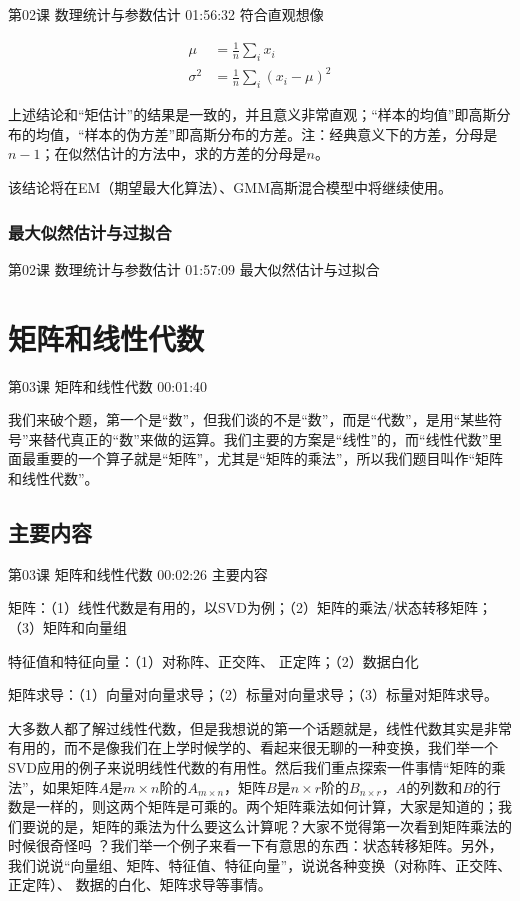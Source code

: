 \documentclass[UTF8]{ctexart}
\begin{document}
第02课 数理统计与参数估计 01:56:32 符合直观想像

\begin{equation}
\begin{aligned}
\mu &= \frac{1}{n} \sum_{i} x_{i} \\
\sigma^{2} &=\frac{1}{n}\sum_{i} (x_{i}-\mu)^{2}
\end{aligned}
\end{equation}

上述结论和“矩估计”的结果是一致的，并且意义非常直观；“样本的均值”即高斯分布的均值，“样本的伪方差”即高斯分布的方差。注：经典意义下的方差，分母是$n-1$；在似然估计的方法中，求的方差的分母是$n$。

该结论将在EM（期望最大化算法）、GMM高斯混合模型中将继续使用。

\subsubsection{最大似然估计与过拟合}

第02课 数理统计与参数估计 01:57:09 最大似然估计与过拟合

\newpage

\section{矩阵和线性代数}

第03课 矩阵和线性代数 00:01:40

我们来破个题，第一个是“数”，但我们谈的不是“数”，而是“代数”，是用“某些符号”来替代真正的“数”来做的运算。我们主要的方案是“线性”的，而“线性代数”里面最重要的一个算子就是“矩阵”，尤其是“矩阵的乘法”，所以我们题目叫作“矩阵和线性代数”。

\subsection{主要内容}

第03课 矩阵和线性代数 00:02:26 主要内容

矩阵：（1）线性代数是有用的，以SVD为例；（2）矩阵的乘法/状态转移矩阵；（3）矩阵和向量组

特征值和特征向量：（1）对称阵、正交阵、 正定阵；（2）数据白化

矩阵求导：（1）向量对向量求导；（2）标量对向量求导；（3）标量对矩阵求导。

大多数人都了解过线性代数，但是我想说的第一个话题就是，线性代数其实是非常有用的，而不是像我们在上学时候学的、看起来很无聊的一种变换，我们举一个SVD应用的例子来说明线性代数的有用性。然后我们重点探索一件事情“矩阵的乘法”，如果矩阵$A$是$m\times n$阶的$A_{m \times n}$，矩阵$B$是$n \times r$阶的$B_{n \times r}$，$A$的列数和$B$的行数是一样的，则这两个矩阵是可乘的。两个矩阵乘法如何计算，大家是知道的；我们要说的是，矩阵的乘法为什么要这么计算呢？大家不觉得第一次看到矩阵乘法的时候很奇怪吗 ？我们举一个例子来看一下有意思的东西：状态转移矩阵。另外，我们说说“向量组、矩阵、特征值、特征向量”，说说各种变换（对称阵、正交阵、正定阵）、 数据的白化、矩阵求导等事情。
\end{document}
